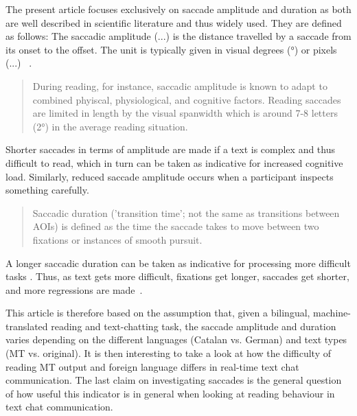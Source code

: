 \documentclass[output=paper,colorlinks,citecolor=brown]{langscibook}
\begin{document}
    The present article focuses exclusively on saccade amplitude and duration as both are well described in scientific literature and thus widely used. They are defined as follows: \glqq The saccadic amplitude (...) is the distance travelled by a saccade from its onset to the offset. The unit is typically given in visual degrees (°) or pixels (...) \grqq~\citep[312]{holmqvist_eye_2011}.
   
   \begin{quote}
       During reading, for instance, saccadic amplitude is known to adapt to combined phyiscal, physiological, and cognitive factors. Reading saccades are limited in length by the visual spanwidth which is around 7-8 letters (2°) in the average reading situation. \citep[312]{holmqvist_eye_2011}
   \end{quote}
   
   Shorter saccades in terms of amplitude are made if a text is complex and thus difficult to read, which in turn can be taken as indicative for increased cognitive load. \citep[24]{jakobsen_reading_2017} Similarly, reduced saccade amplitude occurs when a participant inspects something carefully.
   
   \begin{quote}
       Saccadic duration ('transition time'; not the same as transitions between AOIs) is defined as the time the saccade takes to move between two fixations or instances of smooth pursuit. \citep[321]{holmqvist_eye_2011}
   \end{quote}
   
   A longer saccadic duration can be taken as indicative for processing more difficult tasks \citep[312]{holmqvist_eye_2011}. \glqq Thus, as text gets more difficult, fixations get longer, saccades get shorter, and more regressions are made\grqq~\citep[1460]{rayner_eye_2009}.

    This article is therefore based on the assumption that, given a bilingual, ma\-chine-translated reading and text-chatting task, the saccade amplitude and duration varies depending on the different languages (Catalan vs. German) and text types (MT vs. original). It is then interesting to take a look at how the difficulty of reading MT output and foreign language differs in real-time text chat communication. The last claim on investigating saccades is the general question of how useful this indicator is in general when looking at reading behaviour in text chat communication.
    
\end{document}
